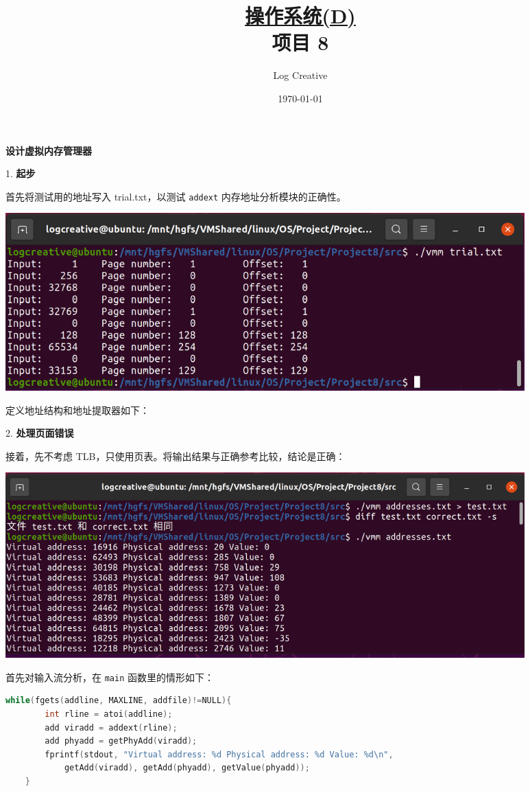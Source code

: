 \documentclass[12pt,a4paper]{article}
\newenvironment{problems}{\begin{list}{}{\renewcommand{\makelabel}[1]{\textbf{##1}\hfil}}}{\end{list}}
\providecommand{\code}[2]{}
\begin{document}
\title{\normalsize \underline{操作系统(D)}\\\LARGE 项目 8}
\author{Log Creative }
\date{\today}
\maketitle

\textbf{设计虚拟内存管理器}

\begin{problems}
    \item[1.] \textbf{起步}
    
    首先将测试用的地址写入 trial.txt，以测试 \verb"addext" 内存地址分析模块的正确性。
    \code{src/trial.txt}{}

    \includegraphics[width=0.88\textwidth]{trial.png}

    定义地址结构和地址提取器如下：
    \code{src/addext.h}{c}
    \code{src/addext.c}{c}
    
    \item[2.] \textbf{处理页面错误}
    
    接着，先不考虑 TLB，只使用页表。将输出结果与正确参考比较，结论是正确：

    \includegraphics[width=0.88\textwidth]{pagetab.png}

    首先对输入流分析，在 \verb"main" 函数里的情形如下：
    \begin{lstlisting}[language=c]
    while(fgets(addline, MAXLINE, addfile)!=NULL){
        int rline = atoi(addline);
        add viradd = addext(rline);
        add phyadd = getPhyAdd(viradd);
        fprintf(stdout, "Virtual address: %d Physical address: %d Value: %d\n", 
            getAdd(viradd), getAdd(phyadd), getValue(phyadd));
    }
    \end{lstlisting}


\end{problems}
\end{document}

